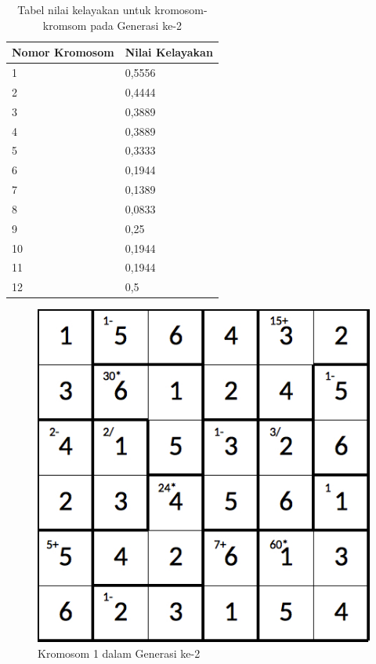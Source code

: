 \begin{table}
\centering
\captionsetup{justification=centering}
\caption[Tabel nilai kelayakan untuk kromosom-kromsom pada Generasi ke-1]{Tabel nilai kelayakan untuk kromosom-kromsom pada Generasi ke-2}
\begin{tabular}{| l | l |}
\hline
Nomor Kromosom & Nilai Kelayakan \\
\hline \hline
1 & 0,5556 \\
\hline
2 & 0,4444 \\
\hline
3 & 0,3889 \\
\hline
4 & 0,3889 \\
\hline
5 & 0,3333 \\
\hline
6 & 0,1944 \\
\hline
7 & 0,1389 \\
\hline
8 & 0,0833 \\
\hline
9 & 0,25 \\
\hline
10 & 0,1944 \\
\hline
11 & 0,1944 \\
\hline
12 & 0,5 \\
\hline
\end{tabular}
\label{tab:analisishg3}
\end{table}

\clearpage

\begin{figure}
\centering
\captionsetup{justification=centering}
\includegraphics[scale=0.333]{Gambar/hybridgenetic/Generation2Chromosome1}
\caption[Kromosom 1 dalam Generasi ke-2]{Kromosom 1 dalam Generasi ke-2}
\label{fig:analisisg2k1}
\end{figure}


